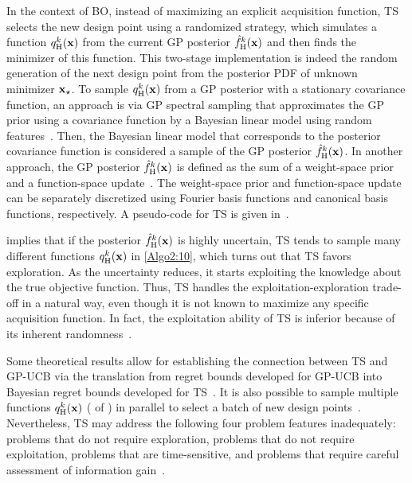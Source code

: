 \documentclass[journal ]{new-aiaa}
\newcommand{\edit}[1]{\textcolor{red}{#1}} %
\begin{document}
In the context of BO, instead of maximizing an explicit acquisition function, TS selects the new design point using a randomized strategy, which simulates a function $q_\text{H}^k({\bf x})$ from the current GP posterior $\hat{f}_\text{H}^k({\bf x})$ and then finds the minimizer of this function.
{This two-stage implementation is indeed the random generation of the next design point from the posterior PDF of unknown minimizer ${\bf x}_\star$.}
To sample $q_\text{H}^k({\bf x})$ from a GP posterior with a stationary covariance function, an approach is via GP spectral sampling that approximates the GP prior using a covariance function by a Bayesian linear model using random features~\citep{HernandezLobato2014}.
Then, the Bayesian linear model that corresponds to the posterior covariance function is considered a sample of the GP posterior $\hat{f}_\text{H}^k({\bf x})$.
In another approach, the GP posterior $\hat{f}_\text{H}^k({\bf x})$ is defined as the sum of a weight-space prior and a function-space update~\citep{Wilson2020}.
The weight-space prior and function-space update can be separately discretized using Fourier basis functions and canonical basis functions, respectively. 
A pseudo-code for TS is given in~.

 implies that if the posterior $\hat{f}_\text{H}^k({\bf x})$ is highly uncertain, TS tends to sample many different functions $q_\text{H}^k({\bf x})$ in \cref{Algo2:10}, which turns out that TS favors exploration.
As the uncertainty reduces, it starts exploiting the knowledge about the true objective function.
Thus, TS handles the exploitation-exploration trade-off in a natural way, even though it is not known to maximize any specific acquisition function. 
In fact, the exploitation ability of TS is inferior because of its inherent randomness~\citep{Scott2010}.

Some theoretical results allow for establishing the connection between TS and GP-UCB via the translation from regret bounds developed for GP-UCB into Bayesian regret bounds developed for TS~\citep{Russo2014}.
It is also possible to sample multiple functions $q_\text{H}^k({\bf x})$ ( of ) in parallel to select a batch of new design points~\citep{Kandasamy2018}.
Nevertheless, TS may address the following four problem features inadequately: problems that do not require exploration, problems that do not require exploitation, problems that are time-sensitive, and problems that require careful assessment of information gain~\citep{Russo2018}.
\end{document}
